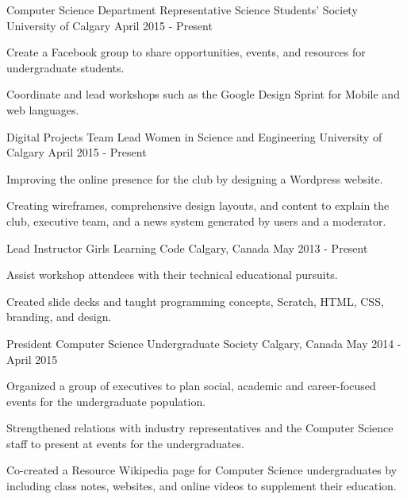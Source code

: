 \begin{cventries}
  \cventry
    {Computer Science Department Representative}
    {Science Students' Society}
    {University of Calgary}
    {April 2015 - Present}
    {
      \begin{cvitems}
        \item {Create a Facebook group to share opportunities, events, and resources for undergraduate students.}
        \item {Coordinate and lead workshops such as the Google Design Sprint for Mobile and web languages.}
      \end{cvitems}
    }
  \cventry
    {Digital Projects Team Lead}
    {Women in Science and Engineering}
    {University of Calgary}
    {April 2015 - Present}
    {
      \begin{cvitems}
        \item {Improving the online presence for the club by designing a Wordpress website.}
        \item {Creating wireframes, comprehensive design layouts, and content to explain the club, executive team, and a news system generated by users and a moderator.}
      \end{cvitems}
    }
  \cventry
    {Lead Instructor}
    {Girls Learning Code}
    {Calgary, Canada}
    {May 2013 - Present}
    {
      \begin{cvitems}
        \item {Assist workshop attendees with their technical educational pursuits.}
        \item {Created slide decks and taught programming concepts, Scratch, HTML, CSS, branding, and design.}
      \end{cvitems}
    }
  \cventry
    {President}
    {Computer Science Undergraduate Society}
    {Calgary, Canada}
    {May 2014 - April 2015}
    {
      \begin{cvitems}
        \item {Organized a group of executives to plan social, academic and career-focused events for the undergraduate population.}
        \item {Strengthened relations with industry representatives and the Computer Science staff to present at events for the undergraduates.}
        \item {Co-created a Resource Wikipedia page for Computer Science undergraduates by including class notes, websites, and online videos to supplement their education.}
      \end{cvitems}
}
\end{cventries}
